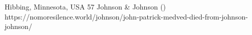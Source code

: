           {Hibbing, Minnesota, USA}
          {57}
          {Johnson \& Johnson}
          {}
          { ()}
          {https://nomoresilence.world/johnson/john-patrick-medved-died-from-johnson-johnson/}

